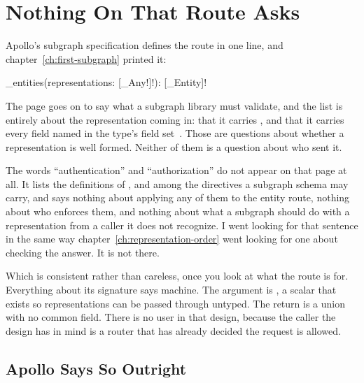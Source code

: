 \section{Nothing On That Route Asks}
\label{sec:ch12-nothing-on-that-route-asks}

%
Apollo's subgraph specification defines the route in one line, and
chapter~\ref{ch:first-subgraph} printed it:

\begin{graphqlsdl}[fontsize=\footnotesize]
_entities(representations: [_Any!]!): [_Entity]!
\end{graphqlsdl}

%
The page goes on to say what a subgraph library must validate, and the list
is entirely about the representation coming in: that it carries
, and that it carries every field named in the type's
 field set~\autocite{apollosubgraphspec}. Those are questions
about whether a representation is well formed. Neither of them is a question
about who sent it.

%
The words \enquote{authentication} and \enquote{authorization} do not appear
on that page at all. It lists the definitions of ,
 and  among the directives a subgraph
schema may carry, and says nothing about applying any of them to the entity
route, nothing about who enforces them, and nothing about what a subgraph
should do with a representation from a caller it does not recognize. I went
looking for that sentence in the same way chapter~\ref{ch:representation-order}
went looking for one about checking the answer. It is not there.

%
Which is consistent rather than careless, once you look at what the route is
for. Everything about its signature says machine. The argument is
, a scalar that exists so representations can be passed through
untyped. The return is a union with no common field. There is no user in that
design, because the caller the design has in mind is a router that has
already decided the request is allowed.

\subsection{Apollo Says So Outright}

